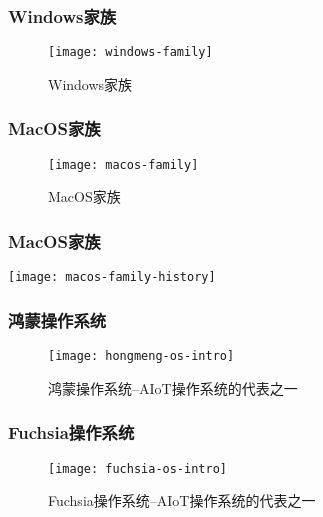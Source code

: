 \begin{frame}
	
	\frametitle{Windows家族}
	
	\begin{figure}
		\centering
		\texttt{[image: windows-family]}
		\caption{Windows家族}
	\end{figure}
	
\end{frame}
\begin{frame}[plain]
	
	\frametitle{MacOS家族}
	
	\begin{figure}
		\centering
		\texttt{[image: macos-family]}
		\caption{MacOS家族}
	\end{figure}
	
\end{frame}
\begin{frame}[plain]
	
	\frametitle{MacOS家族}
	
		\texttt{[image: macos-family-history]}
	
\end{frame}

\begin{frame}[plain]
	\frametitle{鸿蒙操作系统}
	
	\begin{figure}
		\centering
		\texttt{[image: hongmeng-os-intro]}
		\caption{鸿蒙操作系统--AIoT操作系统的代表之一}
	\end{figure}
	
\end{frame}


\begin{frame}[plain]
	\frametitle{Fuchsia操作系统}
	
	\begin{figure}
		\centering
		\texttt{[image: fuchsia-os-intro]}
		\caption{Fuchsia操作系统--AIoT操作系统的代表之一}
	\end{figure}
	
\end{frame}


